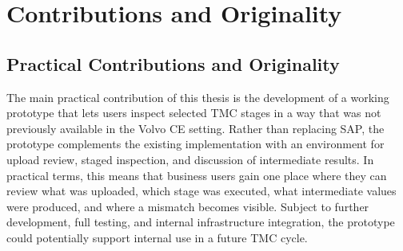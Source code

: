 





\section{Contributions and Originality}
\subsection{Practical Contributions and Originality}

The main practical contribution of this thesis is the development of a working prototype that lets users inspect selected TMC stages in a way that was not previously available in the Volvo CE setting. Rather than replacing SAP, the prototype complements the existing implementation with an environment for upload review, staged inspection, and discussion of intermediate results. In practical terms, this means that business users gain one place where they can review what was uploaded, which stage was executed, what intermediate values were produced, and where a mismatch becomes visible. Subject to further development, full testing, and internal infrastructure integration, the prototype could potentially support internal use in a future TMC cycle.

